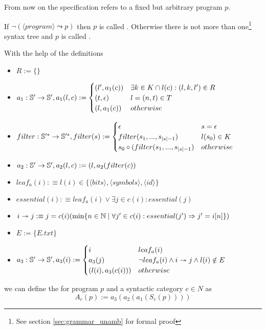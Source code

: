From now on the specification refers to a fixed but arbitrary program $p$.

If $\neg(\langle program \rangle \leadsto p)$ then $p$ is called .
Otherwise there is not more than one\footnote{See section  \ref{sec:grammar_unamb} for formal proof} syntax tree and $p$ is called .

\bigskip

With the help of the definitions 
\begin{itemize}

\item $ R:=\{  \}$
\bigskip
\item $
a_1 : \mathbb{S}' \rightarrow  \mathbb{S}',  a_1(l, c) :=  \begin{cases} (l', a_1(c)) & \exists k \in K \cap l(c) : (l, k, l') \in R\\
(t, \epsilon) & l = (n, t) \in T \\
 (l, a_1(c)) & otherwise \\ \end{cases}$
\bigskip
\item $filter : \mathbb{S}'^\ast \rightarrow \mathbb{S}'^\ast,  filter(s) :=  \begin{cases} \epsilon & s = \epsilon \\
								 filter(s_1, ... , s_{\vert s \vert - 1}) & l(s_0) \in K \\
					  s_0 \circ (filter(s_1, ... , s_{\vert s \vert - 1}) & otherwise \end{cases}$
\bigskip
\item $a_2 : \mathbb{S}' \rightarrow  \mathbb{S}',  a_2(l, c) :=  (l, a_2(filter(c))$
\bigskip
\item $leaf_a(i) : \equiv l(i) \in \{\langle bits \rangle, \langle symbols \rangle, \langle id \rangle\} $
\bigskip
\item $essential(i) : \equiv leaf_a(i) \vee \exists j \in c(i) : essential(j) $
\bigskip
\item $i \twoheadrightarrow j  :\equiv  j = c(i)(\min \{n \in \mathbb{N} \mid  \forall j' \in c(i) : essential(j') \Rightarrow j' = i[n]\})$
\bigskip
\item $E := \{  {E.txt}\}$

\bigskip
\item $a_3 : \mathbb{S}' \rightarrow  \mathbb{S}',  a_3(i) := \begin{cases} i & leaf_a(i) \\ a_3(j) & \neg leaf_a(i) \wedge i \twoheadrightarrow j  \wedge l(i) \notin E \\ (l(i), a_3(c(i))) & otherwise\end{cases}$
\end{itemize}
we can define the  for program $p$ and a syntactic category $c \in N$ as
\[A_c(p) := a_3(a_2(a_1(S_c(p)))) \]

